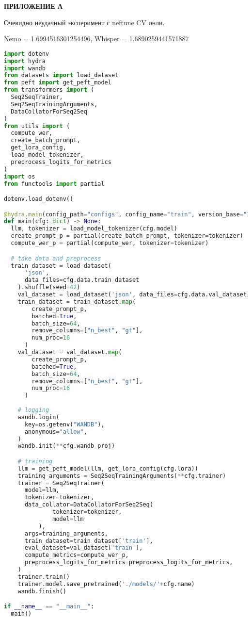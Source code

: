 \newpage
\begin{center}
  \textbf{\large ПРИЛОЖЕНИЕ А}
\end{center}

Очевидно неудачный эксперимент с neftune CV онли.

Nemo = 1.6994516301254496, Whisper = 1.6890259441571887

\begin{lstlisting}[language=Python,label={lst:train},caption=train.py,breaklines=true,]
import dotenv
import hydra
import wandb
from datasets import load_dataset
from peft import get_peft_model
from transformers import (
  Seq2SeqTrainer,
  Seq2SeqTrainingArguments,
  DataCollatorForSeq2Seq
)
from utils import (
  compute_wer,
  create_batch_prompt,
  get_lora_config,
  load_model_tokenizer,
  preprocess_logits_for_metrics
)
import os
from functools import partial

dotenv.load_dotenv()

@hydra.main(config_path="configs", config_name="train", version_base="1.3")
def main(cfg: dict) -> None:
  llm, tokenizer = load_model_tokenizer(cfg.model)
  create_prompt_p = partial(create_batch_prompt, tokenizer=tokenizer)
  compute_wer_p = partial(compute_wer, tokenizer=tokenizer)

  # take data and preprocess
  train_dataset = load_dataset(
      'json',
      data_files=cfg.data.train_dataset
    ).shuffle(seed=42)
    val_dataset = load_dataset('json', data_files=cfg.data.val_dataset)
    train_dataset = train_dataset.map(
        create_prompt_p,
        batched=True,
        batch_size=64,
        remove_columns=["n_best", "gt"],
        num_proc=16
      )
    val_dataset = val_dataset.map(
        create_prompt_p,
        batched=True,
        batch_size=64,
        remove_columns=["n_best", "gt"],
        num_proc=16
      )
    
    # logging
    wandb.login(
      key=os.getenv("WANDB"), 
      anonymous="allow",
    )
    wandb.init(**cfg.wandb_proj)

    # training
    llm = get_peft_model(llm, get_lora_config(cfg.lora))
    training_arguments = Seq2SeqTrainingArguments(**cfg.trainer)
    trainer = Seq2SeqTrainer(
      model=llm,
      tokenizer=tokenizer,
      data_collator=DataCollatorForSeq2Seq(
              tokenizer=tokenizer,
              model=llm
          ),
      args=training_arguments,
      train_dataset=train_dataset['train'],
      eval_dataset=val_dataset['train'],
      compute_metrics=compute_wer_p,
      preprocess_logits_for_metrics=preprocess_logits_for_metrics,
    )
    trainer.train()
    trainer.model.save_pretrained('./models/'+cfg.name)
    wandb.finish()

if __name__ == "__main__":
  main()
\end{lstlisting}

